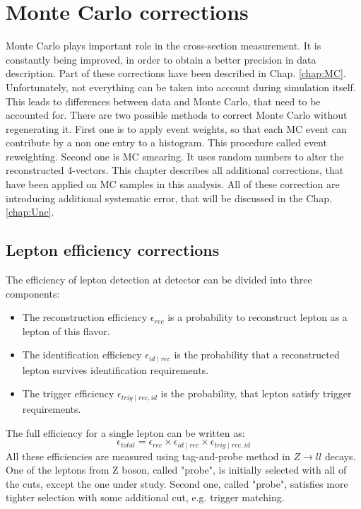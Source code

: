 \chapter{Monte Carlo corrections}\label{chap:MCCor}
Monte Carlo plays important role in the cross-section measurement. It is constantly being improved, in order to obtain a better precision in data description. Part of these corrections have been described in Chap. \ref{chap:MC}. Unfortunately, not everything can be taken into account during simulation itself. This leads to differences between data and Monte Carlo, that need to be accounted for. There are two possible methods to correct Monte Carlo without regenerating it. First one is to apply event weights, so that each MC event can contribute by a non one entry to a histogram. This procedure called event reweighting. Second one is MC smearing. It uses random numbers to alter the reconstructed 4-vectors. 
This chapter describes all additional corrections, that have been applied on MC samples in this analysis. All of these correction are introducing additional systematic error, that will be discussed in the Chap. \ref{chap:Unc}.

\section{Lepton efficiency corrections}\label{sec:Eff}

The efficiency of lepton detection at \atlas detector can be divided into three components:
\begin{itemize}
\item The reconstruction efficiency $\epsilon_{rec}$ is a probability to reconstruct lepton as a lepton of this flavor.
\item The identification efficiency $\epsilon_{id \mid rec}$ is the probability that a reconstructed lepton survives  identification requirements. 
\item The trigger efficiency $\epsilon_{trig \mid rec,id}$ is the probability, that lepton satisfy trigger requirements. 
\end{itemize}
The full efficiency for a single lepton can be written as:
\begin{equation}
\epsilon_{total}=\epsilon_{rec} \times \epsilon_{id \mid rec} \times \epsilon_{trig \mid rec,id}
\end{equation}
All these efficiencies are measured using tag-and-probe method in $Z\to ll$ decays.  One of the leptons from Z boson, called "probe", is initially selected with all of the cuts, except the one under study. Second one, called "probe", satisfies more tighter selection with some additional cut, e.g. trigger matching.


